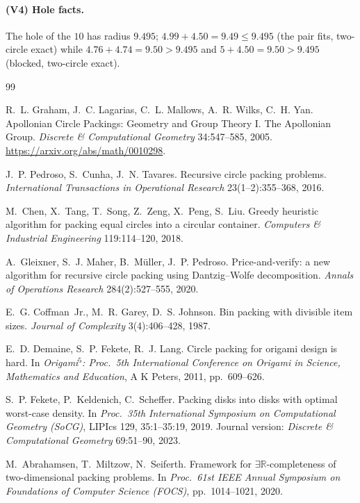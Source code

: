 \documentclass[11pt]{article}
\theoremstyle{definition}
\begin{document}
\paragraph{(V4) Hole facts.} The hole of the $10$ has radius $9.495$;
$4.99+4.50=9.49\le9.495$ (the pair fits, two-circle exact) while
$4.76+4.74=9.50>9.495$ and $5+4.50=9.50>9.495$ (blocked, two-circle exact).

\begin{thebibliography}{99}

R.~L. Graham, J.~C. Lagarias, C.~L. Mallows, A.~R. Wilks, C.~H. Yan.
Apollonian Circle Packings: Geometry and Group Theory I. The Apollonian Group.
\emph{Discrete \& Computational Geometry} 34:547--585, 2005.
\url{https://arxiv.org/abs/math/0010298}.


J.~P. Pedroso, S.~Cunha, J.~N. Tavares.
Recursive circle packing problems.
\emph{International Transactions in Operational Research} 23(1--2):355--368,
2016.

M.~Chen, X.~Tang, T.~Song, Z.~Zeng, X.~Peng, S.~Liu.
Greedy heuristic algorithm for packing equal circles into a circular
container.
\emph{Computers \& Industrial Engineering} 119:114--120, 2018.

A.~Gleixner, S.~J. Maher, B.~M\"uller, J.~P. Pedroso.
Price-and-verify: a new algorithm for recursive circle packing using
Dantzig--Wolfe decomposition.
\emph{Annals of Operations Research} 284(2):527--555, 2020.

E.~G. Coffman~Jr., M.~R. Garey, D.~S. Johnson.
Bin packing with divisible item sizes.
\emph{Journal of Complexity} 3(4):406--428, 1987.

E.~D. Demaine, S.~P. Fekete, R.~J. Lang.
Circle packing for origami design is hard.
In \emph{Origami$^5$: Proc.\ 5th International Conference on Origami in
Science, Mathematics and Education}, A K Peters, 2011, pp.\ 609--626.

S.~P. Fekete, P.~Keldenich, C.~Scheffer.
Packing disks into disks with optimal worst-case density.
In \emph{Proc.\ 35th International Symposium on Computational Geometry (SoCG)},
LIPIcs 129, 35:1--35:19, 2019. Journal version:
\emph{Discrete \& Computational Geometry} 69:51--90, 2023.

M.~Abrahamsen, T.~Miltzow, N.~Seiferth.
Framework for $\exists\mathbb R$-completeness of two-dimensional packing
problems.
In \emph{Proc.\ 61st IEEE Annual Symposium on Foundations of Computer
Science (FOCS)}, pp.\ 1014--1021, 2020.


\end{thebibliography}
\end{document}

